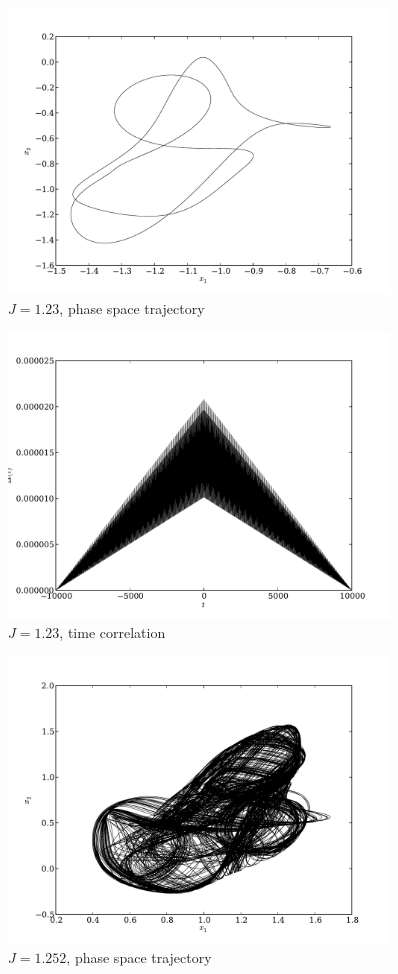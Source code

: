 \documentclass{article} %
\begin{document}
\begin{figure}[p]
	\centering
	\includegraphics[width=0.9\textwidth]{paul_figs/J_1_23}
	\caption{$J=1.23$, phase space trajectory}
	\label{fig:first_pstcorr}
\end{figure}
\begin{figure}[p]
	\centering
	\includegraphics[width=0.9\textwidth]{paul_figs/tcorr_J_1_23}
	\caption{$J=1.23$, time correlation}
\end{figure}
\begin{figure}[p]
	\centering
	\includegraphics[width=0.9\textwidth]{paul_figs/J_1_252}
	\caption{$J=1.252$, phase space trajectory}
\end{figure}
\end{document}
